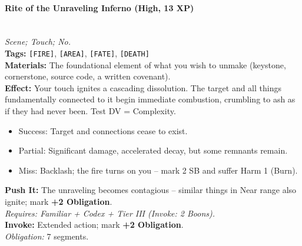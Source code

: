 \paragraph{Rite of the Unraveling Inferno (High, 13 XP)} \hfill \\
\emph{Scene; Touch; No.} \\
\textbf{Tags:} \texttt{[FIRE]}, \texttt{[AREA]}, \texttt{[FATE]}, \texttt{[DEATH]} \\
\textbf{Materials:} The foundational element of what you wish to unmake (keystone, cornerstone, source code, a written covenant). \\
\textbf{Effect:} Your touch ignites a cascading dissolution. The target and all things fundamentally connected to it begin immediate combustion, crumbling to ash as if they had never been. Test DV = Complexity.
\begin{itemize}
  \item Success: Target and connections cease to exist.
  \item Partial: Significant damage, accelerated decay, but some remnants remain.
  \item Miss: Backlash; the fire turns on you – mark 2 SB and suffer Harm 1 (Burn).
\end{itemize}
\textbf{Push It:} The unraveling becomes contagious – similar things in Near range also ignite; mark \textbf{+2 Obligation}. \\
\emph{Requires: Familiar + Codex + Tier III (\textit{Invoke:} 2 Boons).} \\
\textbf{Invoke:} Extended action; mark \textbf{+2 Obligation}. \\
\emph{Obligation:} 7 segments.

